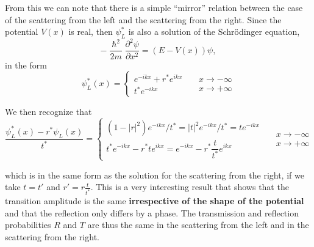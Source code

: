 From this we can note that there is a simple ``mirror'' relation between the case of the scattering from the left and the scattering from the right. Since the potential $V(x)$ is real, then $\psi_L^*$ is also a solution of the Schr\"odinger equation, 
\[ -\dfrac{\hslash^2}{2m} \dfrac{\partial^2 \psi}{\partial x^2} = (E-V(x)) \psi, \]
in the form
\begin{equation}
\psi_L^*(x) = \left \{ 
    \begin{matrix}
 e^{-ikx} + r^* e^{ikx}  \\
 t^* e^{-ikx} 
\end{matrix}
    \right . \; \; \; \; 
    \begin{matrix}
 x \rightarrow -\infty  \\
 x \rightarrow +\infty 
\end{matrix}
\end{equation}

We then recognize that
\begin{equation}
\dfrac{\psi_L^*(x) -r^* \psi_L(x)}{t^*}  = \left \{ 
    \begin{matrix}
 (1-|r|^2) e^{-ikx} /t^* = |t|^2 e^{-ikx} / t^* = t e^{-ikx} \\
 t^* e^{-ikx} -r^* t e^{ikx} = e^{-ikx} -r^* \dfrac{t}{t^*} e^{ikx} 
\end{matrix}
    \right . \; \; \; \; 
    \begin{matrix}
 x \rightarrow -\infty  \\
 x \rightarrow +\infty 
\end{matrix}
\end{equation}

which is in the same form as the solution for the scattering from the right, if we take $t = t'$ and $r'= r \frac{t}{t^*}$. This is a very interesting result that shows that the transition amplitude is the same {\bf irrespective of the shape of the potential} and that the reflection only differs by a phase. The transmission and reflection probabilities $R$ and $T$ are thus the same in the scattering from the left and in the scattering from the right.

